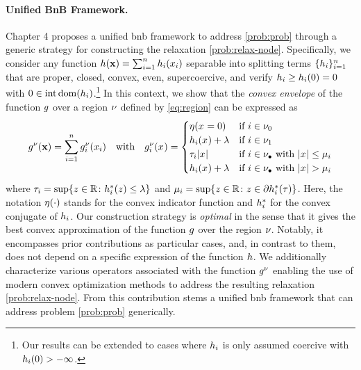 \documentclass[11pt]{article}
\begin{document}
\paragraph{Unified BnB Framework.}

Chapter 4 proposes a unified \gls{bnb} framework to address \eqref{prob:prob} through a generic strategy for constructing the relaxation \eqref{prob:relax-node}.
Specifically, we consider any function $h(\mathbf{x}) = \sum_{i=1}^{n}h_{i}(x_{i})$ separable into splitting terms $\{h_{i}\}_{i=1}^{n}$ that are proper, closed, convex, even, supercoercive, and verify $h_{i} \geq h_{i}(0) = 0$ with $0 \in \operatorname{int}\operatorname{dom}(h_{i})$.\footnote{Our results can be extended to cases where $h_{i}$ is only assumed coercive with $h_{i}(0) > -\infty$.}
In this context, we show that the \emph{convex envelope} of the function $g$ over a region $\nu$ defined by \eqref{eq:region} can be expressed as
\begin{equation}
    g^\nu(\mathbf{x}) = \sum_{i=1}^{n}g_{i}^\nu(x_{i})
    \quad\text{with}\quad
    g_{i}^\nu(x_{}) = 
    \begin{cases}
        \eta(x_{} = 0) &\text{if } i \in \nu_0 \\
        h_{i}(x_{}) + \lambda &\text{if } i \in \nu_1 \\
        \tau_{i} |x_{}| &\text{if } i \in \nu_\bullet \text{ with }|x_{}| \leq \mu_{i} \\
        h_{i}(x_{}) + \lambda &\text{if } i \in \nu_\bullet \text{ with }|x_{}| > \mu_{i}
    \end{cases}
\end{equation}
where $\separable{\pslope}{\idxentry} = \sup\kset{\bvi{} \in \kR}{\conj{\separable{\pfunc}{\idxentry}}(\bvi{}) \leq \reg}$ and $\separable{\plimit}{\idxentry} = \sup\kset{\bvi{} \in \kR}{\bvi{} \in \subdiff\conj{\separable{\pfunc}{\idxentry}}(\pslope)}$.
Here, the notation $\eta(\cdot)$ stands for the convex indicator function and $h_{i}^{*}$ for the convex conjugate of $h_{i}$.
Our construction strategy is \emph{optimal} in the sense that it gives the best convex approximation of the function $g$ over the region $\nu$.
Notably, it encompasses prior contributions as particular cases, and, in contrast to them, does not depend on a specific expression of the function $h$.
We additionally characterize various operators associated with the function $g^\nu$ enabling the use of modern convex optimization methods to address the resulting relaxation \eqref{prob:relax-node}.
From this contribution stems a unified \gls{bnb} framework that can address problem \eqref{prob:prob} generically.
\end{document}
